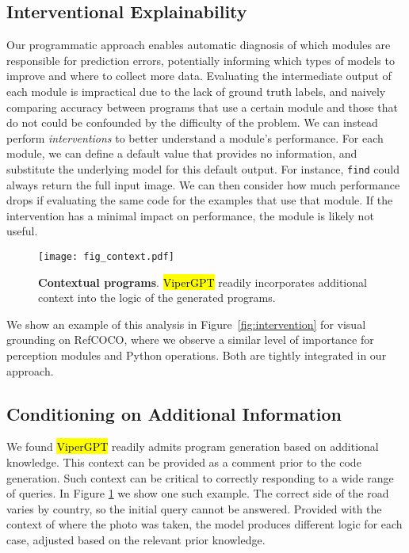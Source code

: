 \documentclass[10pt,twocolumn,letterpaper]{article}
\newcommand{\viper}[0]{{\small\fontfamily{txtt}\selectfont \textcolor{mygreen}{\hl{ViperGPT}}}\xspace}
\begin{document}
\subsection{Interventional Explainability}
Our programmatic approach enables automatic diagnosis of which modules are responsible for prediction errors, potentially informing which types of models to improve and where to collect more data.  Evaluating the intermediate output of each module is impractical due to the lack of ground truth labels, and naively comparing accuracy
between programs that use a certain module and those that do not could be confounded \eg by the difficulty of the problem.  We can instead perform \textit{interventions} to better understand a module's performance. For each module, we can define a default value that provides no information, and substitute the underlying model for this default output. For instance, \texttt{find} could always return the full input image. We can then consider how much performance drops if evaluating the same code for the examples that use that module. If the intervention has a minimal impact on performance, the module is likely not useful.


\begin{figure}[t]
    \texttt{[image: fig\_context.pdf]}
    \caption{\textbf{Contextual programs}. \viper readily incorporates additional context into the logic of the generated programs.}
    \label{fig:context}
    \vspace{-0.3cm}
\end{figure}


We show an example of this analysis in Figure~\ref{fig:intervention} for visual grounding on RefCOCO, where we observe a similar level of importance for perception modules and Python operations. Both are tightly integrated in our approach.

\subsection{Conditioning on Additional Information}

We found \viper readily admits program generation based on additional knowledge. This context can be provided as a comment prior to the code generation. Such context can be critical to correctly responding to a wide range of queries. In Figure \ref{fig:context} we show one such example. The correct side of the road varies by country, so the initial query cannot be answered. Provided with the context of where the photo was taken, the model produces different logic for each case, adjusted based on the relevant prior knowledge.
\end{document}
